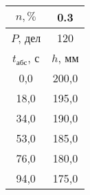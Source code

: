\begin{tabular}[t]{|c|c|}
\hline
$n, \%$ & 0.3 \\
\hline
$P$, дел & 120 \\
\hline
$t_{абс}$, с & $h$, мм \\ 
\hline
0,0 & 200,0 \\ 
18,0 & 195,0 \\ 
34,0 & 190,0 \\ 
53,0 & 185,0 \\ 
76,0 & 180,0 \\ 
94,0 & 175,0 \\ 
\hline
\end{tabular}